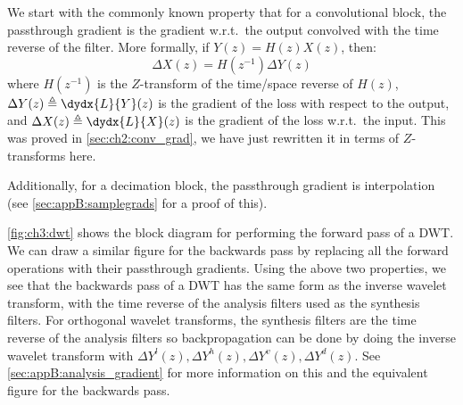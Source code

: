 We start with the commonly known property that for a convolutional block, the
passthrough gradient is the gradient w.r.t.\ the output
convolved with the time reverse of the filter. More formally, if
$Y(z) = H(z) X(z)$, then:
%
\begin{equation}\label{eq:ch3:backprop}
  \Delta X(z) = H(z^{-1}) \Delta Y(z)
\end{equation}
%
where $H(z^{-1})$ is the $Z$-transform of the time/space reverse of $H(z)$,
$\Delta Y(z) \triangleq \dydx{L}{Y}(z)$ is the gradient of the loss with respect
to the output, and $\Delta X(z) \triangleq \dydx{L}{X}(z)$ is the gradient of
the loss w.r.t.\ the input. This was proved in \autoref{sec:ch2:conv_grad}, we
have just rewritten it in terms of $Z$-transforms here.

Additionally, for a decimation block, the passthrough gradient is
interpolation (see \autoref{sec:appB:samplegrads}
for a proof of this).

\autoref{fig:ch3:dwt} shows the block diagram for performing the forward pass of
a DWT\@. We can draw a similar figure for the backwards pass by replacing all the
forward operations with their passthrough gradients. Using the above two
properties, we see that the backwards pass of a DWT has the same form as
the inverse wavelet transform, with the time reverse of the analysis filters
used as the synthesis filters. For orthogonal wavelet transforms, the synthesis
filters are the time reverse of the analysis filters so backpropagation can be
done by doing the inverse wavelet transform with $\Delta Y^l(z), \Delta Y^h(z),
\Delta Y^v(z), \Delta Y^d(z)$. 
See \autoref{sec:appB:analysis_gradient} for more information on this
and the equivalent figure for the backwards pass.

